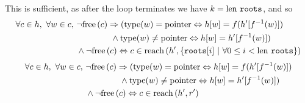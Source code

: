 This is sufficient, as after the loop terminates we have $k = \mathrm{len}~
\mathtt{roots}$, and so
\begin{align*}
  \forall c \in h,\ \forall w \in c,\ &\lnot\mathrm{free}\left(c\right) \Rightarrow
  (\mathrm{type}(w) = \mathrm{pointer} \Leftrightarrow h[w] = f(h'[f^{-1}(w)])\\
  &\quad\quad\quad\quad \land \mathrm{type}(w) \neq \mathrm{pointer}
  \Leftrightarrow h[w] = h'[f^{-1}(w)])\\
  &\land \lnot\mathrm{free}\left(c\right) \Leftrightarrow c \in \mathrm{reach}\left(h', \{\mathtt{roots}[i]~|~\forall
    0 \leq i < \mathrm{len}~\mathtt{roots}\}\right)
\end{align*}
\begin{align*}
  \forall c \in h,\ \forall w \in c,\ &\lnot\mathrm{free}\left(c\right) \Rightarrow
  (\mathrm{type}(w) = \mathrm{pointer} \Leftrightarrow h[w] = f(h'[f^{-1}(w)])\\
  &\quad\quad\quad\quad \land \mathrm{type}(w) \neq \mathrm{pointer}
  \Leftrightarrow h[w] = h'[f^{-1}(w)])\\
  &\land \lnot\mathrm{free}\left(c\right) \Leftrightarrow c \in \mathrm{reach}\left(h', r'\right)
\end{align*}


